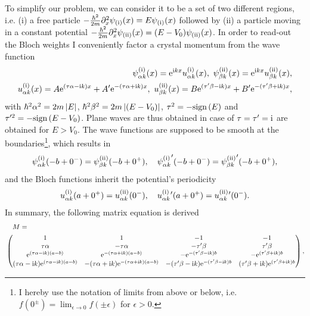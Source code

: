 To simplify our problem, we can consider it to be a set of two different regions, i.e. (i) a free particle $-\frac{\hbar^2}{2m}\partial_x^2\psi_{\rm (i)}(x) = E\psi_{\rm (i)}(x)$ followed by (ii) a particle moving in a constant potential $-\frac{\hbar^2}{2m}\partial_x^2\psi_{\rm (ii)}(x) = (E-V_0)\psi_{\rm (ii)}(x)$.
In order to read-out the Bloch weights I conveniently factor a crystal momentum from the wave function
\begin{align}
    \psi_{\alpha k}^{\rm (i)}(x) = \mathrm e^{\mathrm i kx}u_{\alpha k}^{\rm (i)}(x),
    \
    \psi_{\beta k}^{\rm (ii)}(x) = \mathrm e^{\mathrm i kx}u_{\beta k}^{\rm (ii)}(x),
    \\
    u_{\alpha k}^{\rm (i)}(x) = A\mathrm e^{(\tau\alpha-\mathrm i k) x} + A'\mathrm e^{-(\tau\alpha+\mathrm i k) x},
    \
    u_{\beta k}^{\rm (ii)}(x) = B\mathrm e^{(\tau'\beta-\mathrm i k) x} + B'\mathrm e^{-(\tau'\beta+\mathrm i k) x},
\end{align}
with $\hbar^2\alpha^2 = 2m\left| E \right|$, $\hbar^2\beta^2 = 2m\left| (E-V_0) \right|$, $\tau^2=-\text{sign}\left( E \right)$ and $\tau'^2=-\text{sign}\left( E-V_0 \right)$.
Plane waves are thus obtained in case of $\tau=\tau'=\mathrm i$ are obtained for $E>V_0$.
The wave functions are supposed to be smooth at the boundaries\footnote{I hereby use the notation of limits from above or below, i.e. $f(0^\pm)=\lim_{\epsilon\rightarrow0}f(\pm\epsilon)$ for $\epsilon>0$.}, which results in
\begin{align}
    \psi_{\alpha k}^{\rm (i)}(-b+0^-)=\psi_{\beta k}^{\rm (ii)}(-b+0^+),
    \quad
    {\psi_{\alpha k}^{\rm (i)}}'(-b+0^-)={\psi_{\beta k}^{\rm (ii)}}'(-b+0^+),
\end{align}
and the Bloch functions inherit the potential's periodicity
\begin{align}
    u_{\alpha k}^{\rm (i)}(a+0^+) = u_{\alpha k}^{\rm (ii)}(0^-),
    \quad
    u_{\alpha k}^{\rm (i)}{}'(a+0^+) = u_{\alpha k}^{\rm (ii)}{}'(0^-).
\end{align}
In summary, the following matrix equation is derived
\begin{align}
    &\quad M = \nonumber\\
    &\begin{pmatrix}
        1 & 1 & -1 & -1\\
        \tau\alpha & -\tau\alpha & -\tau'\beta & \tau'\beta\\
        \mathrm e^{(\tau \alpha-\mathrm i k)(a-b)}  & \mathrm e^{-(\tau \alpha+\mathrm i k) (a-b)} &
        -\mathrm e^{-(\tau'\beta -\mathrm i k)b}     & -\mathrm e^{ (\tau'\beta+\mathrm i k)b} \\
        (\tau \alpha-\mathrm i k)\mathrm e^{(\tau \alpha-\mathrm i k)(a-b)}  & -(\tau \alpha+\mathrm i k)\mathrm e^{-(\tau \alpha+\mathrm i k) (a-b)} &
        -(\tau'\beta -\mathrm i k)\mathrm e^{-(\tau'\beta -\mathrm i k)b}     & (\tau'\beta+\mathrm i k)\mathrm e^{ (\tau'\beta+\mathrm i k)b} \\
    \end{pmatrix},
\end{align}
